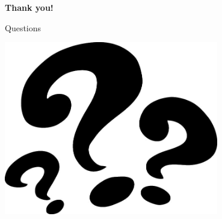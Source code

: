 \documentclass{beamer}
\begin{document}
\begin{frame}
\begin{center}
\begin{Huge}\textbf{Thank you!}\end{Huge}
\end{center}
\end{frame}


\begin{frame}{Questions}
\begin{center}
\includegraphics[width=0.7\textwidth]{./images/question-marks.png}
\end{center}
\end{frame}
\end{document}
